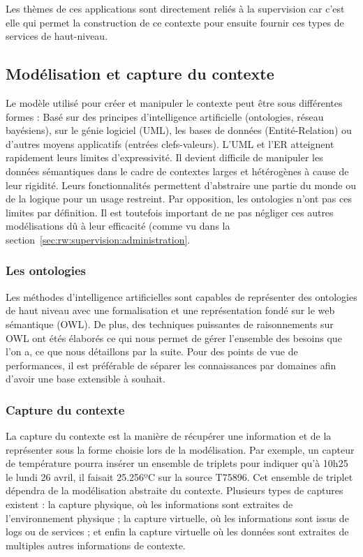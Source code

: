 Les thèmes de ces applications sont directement reliés à la supervision car c'est elle qui permet la construction de ce contexte pour ensuite fournir ces types de services de haut-niveau.

\subsection{Modélisation et capture du contexte}
Le modèle utilisé pour créer et manipuler le contexte peut être sous différentes formes : Basé sur des principes d'intelligence artificielle (ontologies, réseau bayésiens), sur le génie logiciel (UML), les bases de données (Entité-Relation) ou d'autres moyens applicatifs (entrées clefs-valeurs). L'UML et l'ER atteignent rapidement leurs limites d'expressivité. Il devient difficile de manipuler les données sémantiques dans le cadre de contextes larges et hétérogènes à cause de leur rigidité. Leurs fonctionnalités permettent d'abstraire une partie du monde ou de la logique pour un usage restreint. Par opposition, les ontologies n'ont pas ces limites par définition. Il est toutefois important de ne pas négliger ces autres modélisations dû à leur efficacité (comme vu dans la section~\ref{sec:rw:supervision:administration}.

\subsubsection{Les ontologies}
Les méthodes d'intelligence artificielles sont capables de représenter des ontologies de haut niveau avec une formalisation et une représentation fondé sur le web sémantique (OWL). De plus, des techniques puissantes de raisonnements sur OWL ont étés élaborés ce qui nous permet de gérer l'ensemble des besoins que l'on a, ce que nous détaillons par la suite. Pour des points de vue de performances, il est préférable de séparer les connaissances par domaines afin d'avoir une base extensible à souhait.

\subsubsection{Capture du contexte}
La capture du contexte est la manière de récupérer une information et de la représenter sous la forme choisie lors de la modélisation. Par exemple, un capteur de température pourra insérer un ensemble de triplets pour indiquer qu'à 10h25 le lundi 26 avril, il faisait 25.256ºC sur la source T75896. Cet ensemble de triplet dépendra de la modélisation abstraite du contexte. Plusieurs types de captures existent : la capture physique, où les informations sont extraites de l'environnement physique ; la capture virtuelle, où les informations sont issus de logs ou de services ; et enfin la capture virtuelle où les données sont extraites de multiples autres informations de contexte.

